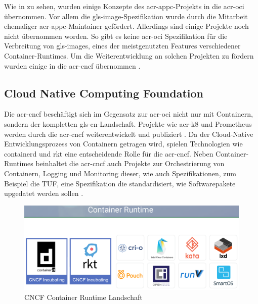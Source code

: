 Wie in  zu sehen, wurden einige Konzepte des \gls{acr-appc}-Projekts in die \gls{acr-oci} übernommen. Vor allem die \gls{gls-image}-Spezifikation wurde durch die Mitarbeit ehemaliger \gls{acr-appc}-Maintainer gefördert. Allerdings sind einige Projekte noch nicht übernommen worden. So gibt es keine \gls{acr-oci} Spezifikation für die Verbreitung von \glspl{gls-image}, eines der meistgenutzten Features verschiedener Container-Runtimes. Um die Weiterentwicklung an solchen Projekten zu fördern wurden einige in die \gls{acr-cncf} übernommen \citep{MakingSenseofContainerStandardsandFoundations:OCICNCFAppcandRkt}.

\subsection{Cloud Native Computing Foundation}
\label{sec:cncf}
Die \gls{acr-cncf} beschäftigt sich im Gegensatz zur \gls{acr-oci} nicht nur mit Containern, sondern der kompletten \gls{gls-cn}-Landschaft. Projekte wie \gls{acr-k8} und Prometheus werden durch die \gls{acr-cncf} weiterentwickelt und publiziert \cite{}. Da der Cloud-Native Entwicklungsprozess von Containern getragen wird, spielen Technologien wie containerd und rkt eine entscheidende Rolle für die \gls{acr-cncf}. Neben Container-Runtimes beinhaltet die \gls{acr-cncf} auch Projekte zur Orchestrierung von Containern, Logging und Monitoring dieser, wie auch Spezifikationen, zum Beispiel die TUF, eine Spezifikation die standardisiert, wie Softwarepakete upgedatet werden sollen \cite{CNCFCloudNativeInteractiveLandscape}.

\begin{figure}[h]
	\begin{center}
		\includegraphics[scale=0.3]{bilder/cncf-container-landscape.png}
		\caption{CNCF Container Runtime Landschaft \citep{CNCFCloudNativeInteractiveLandscape}}
		\label{fig:cncfContainerLandscape}
	\end{center}
\end{figure} 

